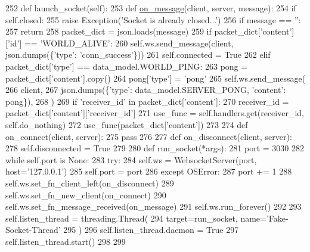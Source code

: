 \begin{DoxyCode}
252     \textcolor{keyword}{def }launch\_socket(self):
253         \textcolor{keyword}{def }\hyperlink{namespaceparlai_1_1chat__service_1_1services_1_1terminal__chat_1_1client_a0ef2bb2bd3b966dcdd8402a92b999708}{on\_message}(client, server, message):
254             \textcolor{keywordflow}{if} self.closed:
255                 \textcolor{keywordflow}{raise} Exception(\textcolor{stringliteral}{'Socket is already closed...'})
256             \textcolor{keywordflow}{if} message == \textcolor{stringliteral}{''}:
257                 \textcolor{keywordflow}{return}
258             packet\_dict = json.loads(message)
259             \textcolor{keywordflow}{if} packet\_dict[\textcolor{stringliteral}{'content'}][\textcolor{stringliteral}{'id'}] == \textcolor{stringliteral}{'WORLD\_ALIVE'}:
260                 self.ws.send\_message(client, json.dumps(\{\textcolor{stringliteral}{'type'}: \textcolor{stringliteral}{'conn\_success'}\}))
261                 self.connected = \textcolor{keyword}{True}
262             \textcolor{keywordflow}{elif} packet\_dict[\textcolor{stringliteral}{'type'}] == data\_model.WORLD\_PING:
263                 pong = packet\_dict[\textcolor{stringliteral}{'content'}].copy()
264                 pong[\textcolor{stringliteral}{'type'}] = \textcolor{stringliteral}{'pong'}
265                 self.ws.send\_message(
266                     client,
267                     json.dumps(\{\textcolor{stringliteral}{'type'}: data\_model.SERVER\_PONG, \textcolor{stringliteral}{'content'}: pong\}),
268                 )
269             \textcolor{keywordflow}{if} \textcolor{stringliteral}{'receiver\_id'} \textcolor{keywordflow}{in} packet\_dict[\textcolor{stringliteral}{'content'}]:
270                 receiver\_id = packet\_dict[\textcolor{stringliteral}{'content'}][\textcolor{stringliteral}{'receiver\_id'}]
271                 use\_func = self.handlers.get(receiver\_id, self.do\_nothing)
272                 use\_func(packet\_dict[\textcolor{stringliteral}{'content'}])
273 
274         \textcolor{keyword}{def }on\_connect(client, server):
275             \textcolor{keywordflow}{pass}
276 
277         \textcolor{keyword}{def }on\_disconnect(client, server):
278             self.disconnected = \textcolor{keyword}{True}
279 
280         \textcolor{keyword}{def }run\_socket(*args):
281             port = 3030
282             \textcolor{keywordflow}{while} self.port \textcolor{keywordflow}{is} \textcolor{keywordtype}{None}:
283                 \textcolor{keywordflow}{try}:
284                     self.ws = WebsocketServer(port, host=\textcolor{stringliteral}{'127.0.0.1'})
285                     self.port = port
286                 \textcolor{keywordflow}{except} OSError:
287                     port += 1
288             self.ws.set\_fn\_client\_left(on\_disconnect)
289             self.ws.set\_fn\_new\_client(on\_connect)
290             self.ws.set\_fn\_message\_received(on\_message)
291             self.ws.run\_forever()
292 
293         self.listen\_thread = threading.Thread(
294             target=run\_socket, name=\textcolor{stringliteral}{'Fake-Socket-Thread'}
295         )
296         self.listen\_thread.daemon = \textcolor{keyword}{True}
297         self.listen\_thread.start()
298 
299 
\end{DoxyCode}
